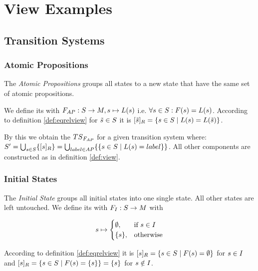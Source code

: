 \documentclass[preview]{standalone}
\begin{document}
\section{View Examples}
\subsection{Transition Systems}
\subsubsection{Atomic Propositions}
The \emph{Atomic Propositions \viewNC} groups all states to a new state that have the same set of atomic propositions.

We define its \grpfctN with $\grpfct_\atomicprops : \states \to \imggrp, {\state}\mapsto{\labelingfct(\state)}$ i.e. $\forall {s} \in {S} : {F}({s}) = {L}({s})$. According to definition \ref{def:eqrelview} for ${\tilde{{s}}} \in {S}$ it is ${{[{\tilde{{s}}}]_{{R}}}} = \{{s} \in {S} \mid {L}({s}) = {L}({\tilde{{s}}})\}$.

By this we obtain the \viewN ${{TS}_{{{F}}_{AP}}}$ for a given transition system \ts where: ${S}' = \bigcup_{{s} \in {S}} \{{{[{s}]_{{R}}}}\} =  \bigcup_{label \in {AP}} \{\{{s} \in {S} \mid {L}({s}) = label\}\}$. All other components are constructed as in definition \ref{def:view}.



\subsubsection{Initial States}
The \emph{Initial State \viewNC}  groups all initial states into one single state. All other states are left untouched.
We define its \grpfctN with ${F}_{I} : {S} \to {\ensuremath{{M}}}$ with 

\[
{s} \mapsto
\begin{cases}
	\emptyset,				& \text{if } {s} \in {I} \\
	\{{s}\},          	& \text{otherwise}
\end{cases}
\]

According to definition \ref{def:eqrelview} it is ${{[{s}]_{{R}}}} = \{{s} \in {S} \mid {F}({s}) = \emptyset\}$ for ${s} \in {I}$ and ${{[{s}]_{{R}}}} = \{{s} \in {S} \mid {F}({s}) = \{{s}\} \} = \{{s}\}$ for ${s} \notin {I}$.
\end{document}
